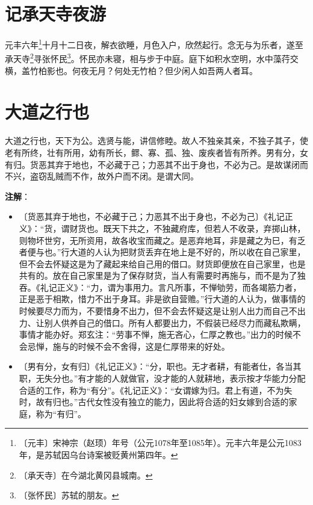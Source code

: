 \documentclass[12pt,UTF-8,openany]{ctexbook}
\begin{document}
\chapter{记承天寺夜游}

\begin{normalsize}
    
    元丰六年\footnote{〔元丰〕宋神宗（赵顼）年号（公元1078年至1085年）。元丰六年是公元1083年，是苏轼因乌台诗案被贬黄州第四年。}十月十二日夜，解衣欲睡，月色入户，欣然起行。念无与为乐者，遂至承天寺\footnote{〔承天寺〕在今湖北黄冈县城南。}寻张怀民\footnote{〔张怀民〕苏轼的朋友。}。怀民亦未寝，相与步于中庭。庭下如积水空明，水中藻荇交横，盖竹柏影也。何夜无月？何处无竹柏？但少闲人如吾两人者耳。
\end{normalsize}



\chapter{大道之行也}

\begin{normalsize}
    
    大道之行也，天下为公。选贤与能，讲信修睦。故人不独亲其亲，不独子其子，使老有所终，壮有所用，幼有所长，鳏、寡、孤、独、废疾者皆有所养。男有分，女有归。货恶其弃于地也，不必藏于己；力恶其不出于身也，不必为己。是故谋闭而不兴，盗窃乱贼而不作，故外户而不闭。是谓大同。
\end{normalsize}


\newpage

\textbf{注解}：

\vspace{-1em}

\begin{itemize}
    \setlength\itemsep{-0.2em}
    \item〔货恶其弃于地也，不必藏于己；力恶其不出于身也，不必为己〕《礼记正义》：“货，谓财货也。既天下共之，不独藏府库，但若人不收录，弃掷山林，则物坏世穷，无所资用，故各收宝而藏之。是恶弃地耳，非是藏之为巳，有乏者便与也。”行大道的人认为把财货丢弃在地上是不好的，所以收在自己家里，但不会去怀疑这是为了藏起来给自己用的借口。财货即便放在自己家里，也是共有的。放在自己家里是为了保存财货，当人有需要时再施与，而不是为了独吞。《礼记正义》：“力，谓为事用力。言凡所事，不惮劬劳，而各竭筋力者，正是恶于相欺，惜力不出于身耳。非是欲自营赡。”行大道的人认为，做事情的时候要尽力而为，不要惜身不出力，但不会去怀疑这是让别人出力而自己不出力、让别人供养自己的借口。所有人都要出力，不假装已经尽力而藏私欺瞒，事情才能办好。郑玄注：“劳事不惮，施无吝心，仁厚之教也。”出力的时候不会忌惮，施与的时候不会不舍得，这是仁厚带来的好处。
    \item〔男有分，女有归〕《礼记正义》：“分，职也。无才者耕，有能者仕，各当其职，无失分也。”有才能的人就做官，没才能的人就耕地，表示按才华能力分配合适的工作，称为“有分”。《礼记正义》：“女谓嫁为归。君上有道，不为失时，故有归也。”古代女性没有独立的能力，因此将合适的妇女嫁到合适的家庭，称为“有归”。
\end{itemize}
\end{document}
